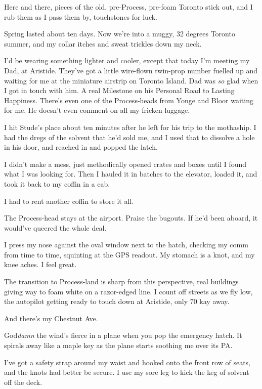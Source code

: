 Here and there, pieces of the old, pre-Process, pre-foam Toronto
stick out, and I rub them as I pass them by, touchstones for luck.

\tb

Spring lasted about ten days. Now we're into a muggy, 32 degrees
Toronto summer, and my collar itches and sweat trickles down my
neck.

I'd be wearing something lighter and cooler, except that today I'm
meeting my Dad, at Aristide. They've got a little wire-flown
twin-prop number fuelled up and waiting for me at the miniature
airstrip on Toronto Island. Dad was \emph{so} glad when I got in
touch with him. A real Milestone on his Personal Road to Lasting
Happiness. There's even one of the Process-heads from Yonge and
Bloor waiting for me. He doesn't even comment on all my fricken
luggage.

\tb

I hit Stude's place about ten minutes after he left for his trip to
the mothaship. I had the dregs of the solvent that he'd sold me,
and I used that to dissolve a hole in his door, and reached in and
popped the latch.

I didn't make a mess, just methodically opened crates and boxes
until I found what I was looking for. Then I hauled it in batches
to the elevator, loaded it, and took it back to my coffin in a
cab.

I had to rent another coffin to store it all.

\tb

The Process-head stays at the airport. Praise the bugouts. If he'd
been aboard, it would've queered the whole deal.

I press my nose against the oval window next to the hatch, checking
my comm from time to time, squinting at the GPS readout. My stomach
is a knot, and my knee aches. I feel great.

The transition to Process-land is sharp from this perspective, real
buildings giving way to foam white on a razor-edged line. I count
off streets as we fly low, the autopilot getting ready to touch
down at Aristide, only 70 kay away.

And there's my Chestnut Ave.

God\emph{damn} the wind's fierce in a plane when you pop the
emergency hatch. It spirals away like a maple key as the plane
starts soothing me over its PA.

I've got a safety strap around my waist and hooked onto the front
row of seats, and the knots had better be secure. I use my sore leg
to kick the keg of solvent off the deck.

